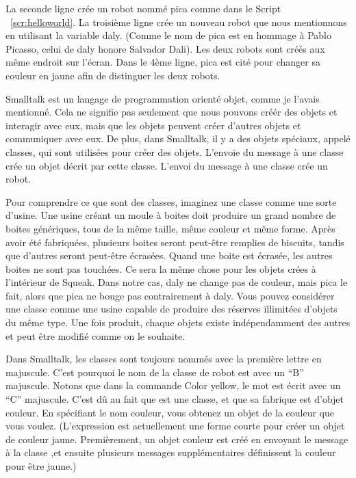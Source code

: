 \documentclass[a4paper,10pt,twoside]{book}
\begin{document}
La seconde ligne cr\'ee un robot nomm\'e pica comme dans le Script ~\ref{scr:helloworld}. La troisi\`eme ligne cr\'ee un nouveau robot que nous mentionnons en utilisant la variable daly. (Comme le nom de pica est en hommage \`a Pablo Picasso, celui de daly honore Salvador Dali). Les deux robots sont cr\'e\'es aux m\^eme endroit sur l'\'ecran. Dans le 4\`eme ligne, pica est cit\'e pour changer sa couleur en jaune afin de distinguer les deux robots.

Smalltalk est un langage de programmation orient\'e objet, comme je l'avais mentionn\'e. Cela ne 
signifie pas seulement que nous pouvons cr\'e\'er des objets et interagir avec eux, mais que les 
objets peuvent cr\'eer d'autres objets et communiquer avec eux.  De plus, dans  Smalltalk, il y 
a des objets sp\'eciaux, appel\'e classes, qui sont utilis\'ees pour cr\'eer des objets. L'envoie du message 
\`a une classe cr\'ee un objet d\'ecrit par cette classe. L'envoi du message  \`a une classe  cr\'ee un robot. 

Pour comprendre ce que sont des classes, imaginez une classe comme une sorte d'usine. Une usine cr\'eant un moule 
\`a boites  doit produire un grand nombre de boites g\'en\'eriques, tous de la m\^eme taille, m\^eme couleur et m\^eme forme. 
Apr\`es avoir \'et\'e fabriqu\'ees, plusieurs boites seront peut-\^etre remplies de biscuits, tandis que d'autres seront 
peut-\^etre \'ecras\'ees. Quand une boite est \'ecras\'ee, les autres boites ne sont pas touch\'ees. Ce sera la m\^eme chose pour 
les objets cr\'ees \`a l'int\'erieur de Squeak. Dans notre cas, daly ne change pas de couleur, mais pica le fait, alors que 
pica ne bouge pas contrairement \`a daly. Vous pouvez consid\'erer une classe comme une usine capable de produire des 
r\'eserves illimit\'ees d'objets du m\^eme type. Une fois produit, chaque objets existe ind\'ependamment des autres et peut \^etre 
modifi\'e comme on le souhaite.

Dans Smalltalk, les classes sont toujours nomm\'es avec la premi\`ere lettre en majuscule. C'est pourquoi le nom 
de la classe de robot est  avec un ``B'' majuscule. Notons que dans la commande Color yellow, le mot 
 est \'ecrit avec un ``C'' majuscule. C'est d\^u au fait que est une classe, et que sa fabrique 
est d'objet couleur. En sp\'ecifiant le nom couleur, vous obtenez un objet de la couleur que vous voulez. 
(L'expression est actuellement une forme courte pour cr\'eer un objet de couleur jaune. 
Premi\`erement, un objet couleur est cr\'e\'e en envoyant le message \`a la classe ,et ensuite 
plusieurs messages suppl\'ementaires d\'efinissent la couleur pour \^etre jaune.) 
\end{document}
